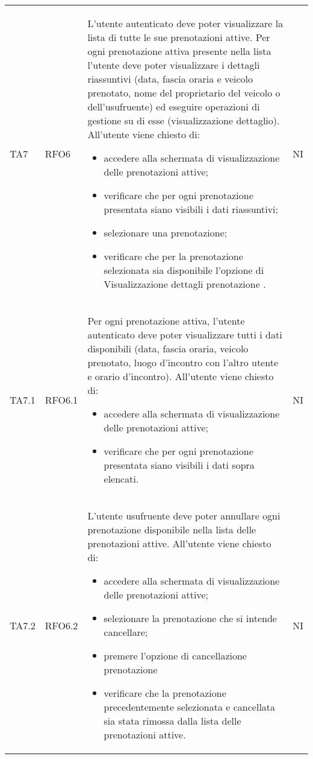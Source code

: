 \begin{longtable}{ >{\centering}p{} >{\centering}p{} >{\centering}p{}
			>{\centering}p{}}
		 
		 TA7 & RFO6  & L'utente autenticato deve poter visualizzare la lista di tutte le sue prenotazioni attive.
		 Per ogni prenotazione attiva presente nella lista l'utente deve poter visualizzare i dettagli riassuntivi (data, fascia oraria e veicolo prenotato, nome del proprietario del veicolo o dell'usufruente) ed eseguire operazioni di gestione su di esse (visualizzazione dettaglio). All'utente viene chiesto di:
		 \begin{itemize}
		 	\item accedere alla schermata di visualizzazione delle prenotazioni attive;
		 	\item verificare che per ogni prenotazione presentata siano visibili i dati riassuntivi;
		 	\item selezionare una prenotazione;
		 	\item verificare che per la prenotazione selezionata sia disponibile l'opzione di Visualizzazione dettagli prenotazione .
		 \end{itemize} & NI	\tabularnewline
		 	TA7.1 & RFO6.1 &	Per ogni prenotazione attiva, l'utente autenticato deve poter visualizzare tutti i dati disponibili (data, fascia oraria, veicolo prenotato, luogo d'incontro con l'altro utente e orario d'incontro). All'utente viene chiesto di:
		 \begin{itemize}
		 	\item accedere alla schermata di visualizzazione delle prenotazioni attive;
		 	\item verificare che per ogni prenotazione presentata siano visibili i dati sopra elencati.
		 \end{itemize}	&	NI	\tabularnewline
		 TA7.2 & RFO6.2 &	L'utente usufruente deve poter annullare ogni prenotazione disponibile nella lista delle prenotazioni attive. All'utente viene chiesto di:
		 \begin{itemize}
		 	\item accedere alla schermata di visualizzazione delle prenotazioni attive;
		 	\item selezionare la prenotazione che si intende cancellare;
		 	\item premere l'opzione di cancellazione prenotazione
		 	\item verificare che la prenotazione precedentemente selezionata e cancellata sia stata rimossa dalla lista delle prenotazioni attive.
		 \end{itemize}	&	NI	\tabularnewline
		

\end{longtable}
